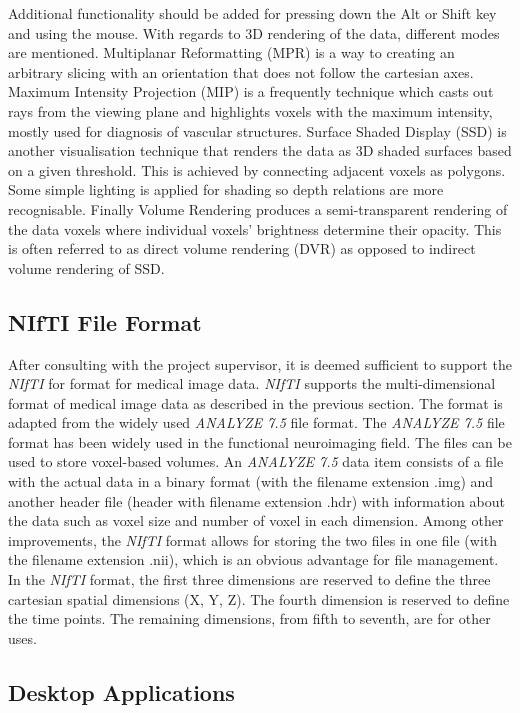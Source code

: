 \documentclass[a4paper,11pt,titlepage]{article}
\begin{document}
Additional functionality should be added for pressing down the Alt or Shift key and using the mouse.
With regards to 3D rendering of the data, different modes are mentioned. Multiplanar Reformatting (MPR) is a way to creating an arbitrary slicing with an orientation that does not follow the cartesian axes. Maximum Intensity Projection (MIP) is a frequently technique which casts out rays from the viewing plane and highlights voxels with the maximum intensity, mostly used for diagnosis of vascular structures. Surface Shaded Display (SSD) is another visualisation technique that renders the data as 3D shaded surfaces based on a  given threshold. This is achieved by connecting adjacent voxels as polygons. Some simple lighting is applied for shading so depth relations are more recognisable. Finally Volume Rendering produces a semi-transparent rendering of the data voxels where individual voxels' brightness determine their opacity. This is often referred to as direct volume rendering (DVR) as opposed to indirect volume rendering of SSD.

\subsection{NIfTI File Format}

After consulting with the project supervisor, it is deemed sufficient to support the \textit{NIfTI} for format for medical image data. \textit{NIfTI} supports the multi-dimensional format of medical image data as described in the previous section. The format is adapted from the widely used \textit{ANALYZE 7.5} file format. The \textit{ANALYZE 7.5} file format has been widely used in the functional neuroimaging field. The files can be used to store voxel-based volumes. An \textit{ANALYZE 7.5} data item consists of a file with the actual data in a binary format (with the filename extension .img) and another header file (header with filename extension .hdr) with information about the data such as voxel size and number of voxel in each dimension. Among other improvements, the \textit{NIfTI} format allows for storing the two files in one file (with the filename extension .nii), which is an obvious advantage for file management.
In the \textit{NIfTI} format, the first three dimensions are reserved to define the three cartesian spatial dimensions (X, Y, Z). The fourth dimension is reserved to define the time points. The remaining dimensions, from fifth to seventh, are for other uses. 

\subsection{Desktop Applications}
\end{document}
